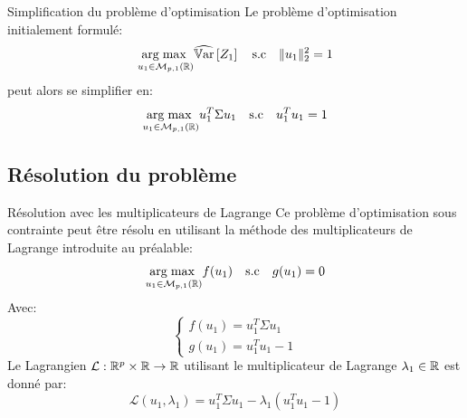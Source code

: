 \begin{frame}{Simplification du problème d'optimisation}
	Le problème d'optimisation initialement formulé:
	\begin{equation}
		\underset{u_1 \in \mathcal{M}_{p,1}(\mathbb{R})}{\operatorname{arg\;max}\;} \widehat{\operatorname{\mathbb{V}ar}}\left[Z_1\right] \quad \text{s.c} \quad \|u_1\|_2^2 = 1
		\nonumber
	\end{equation}
	\pause
	peut alors se simplifier en:
	\begin{equation}
		\underset{u_1 \in \mathcal{M}_{p,1}(\mathbb{R})}{\operatorname{arg\;max}\;} u_1^T \Sigma u_1 \quad \text{s.c} \quad u_1^T u_1 = 1
		\nonumber
	\end{equation}
\end{frame}

\subsection[Résolution du problème]{Résolution du problème}

\begin{frame}{Résolution avec les multiplicateurs de Lagrange}
	Ce problème d'optimisation sous contrainte peut être résolu en utilisant la méthode des multiplicateurs de Lagrange introduite au préalable:
	\begin{equation}
		\underset{u_1 \in \mathcal{M}_{p,1}(\mathbb{R})}{\operatorname{arg\;max}\;} f(u_1) \quad \text{s.c} \quad g(u_1) = 0
		\nonumber
	\end{equation}
	Avec:
	\begin{equation}
		\begin{cases}
			f(u_1) = u_1^T \Sigma u_1 \\
			g(u_1) = u_1^T u_1 - 1
		\end{cases}
		\nonumber
	\end{equation}
	\pause
	Le Lagrangien $\mathcal{L}: \mathbb{R}^p \times \mathbb{R} \to \mathbb{R}$ utilisant le multiplicateur de Lagrange $\lambda_1 \in \mathbb{R}$ est donné par:
	\begin{equation}
		\mathcal{L}(u_1, \lambda_1) = u_1^T \Sigma u_1 - \lambda_1 \left(u_1^T u_1 - 1\right)
		\nonumber
	\end{equation}
\end{frame}

